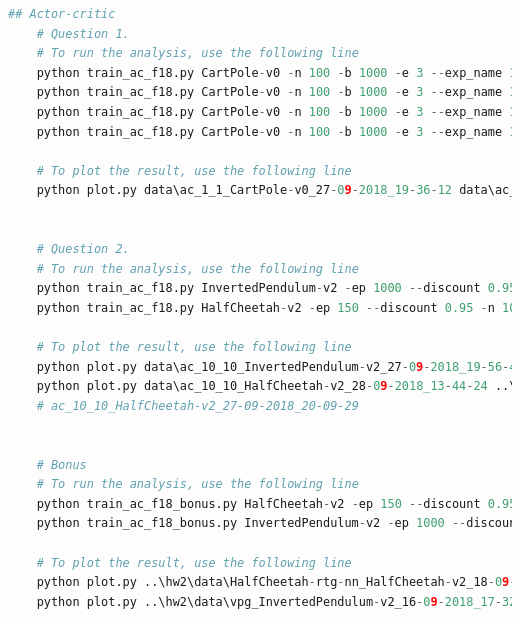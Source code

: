 \documentclass[12pt]{article}
\begin{document}
  \pagebreak

  \begin{lstlisting}[language=Python]
	## Actor-critic
	# Question 1.
	# To run the analysis, use the following line
	python train_ac_f18.py CartPole-v0 -n 100 -b 1000 -e 3 --exp_name 1_1 -ntu 1 -ngsptu 1
	python train_ac_f18.py CartPole-v0 -n 100 -b 1000 -e 3 --exp_name 100_1 -ntu 100 -ngsptu 1
	python train_ac_f18.py CartPole-v0 -n 100 -b 1000 -e 3 --exp_name 1_100 -ntu 1 -ngsptu 100
	python train_ac_f18.py CartPole-v0 -n 100 -b 1000 -e 3 --exp_name 10_10 -ntu 10 -ngsptu 10
	
	# To plot the result, use the following line
	python plot.py data\ac_1_1_CartPole-v0_27-09-2018_19-36-12 data\ac_1_100_CartPole-v0_27-09-2018_19-42-41 data\ac_10_10_CartPole-v0_27-09-2018_19-45-46 data\ac_100_1_CartPole-v0_27-09-2018_19-39-10
	
	
	# Question 2.
	# To run the analysis, use the following line
	python train_ac_f18.py InvertedPendulum-v2 -ep 1000 --discount 0.95 -n 100 -e 3 -l 2 -s 64 -b 5000 -lr 0.01 --exp_name 10_10 -ntu 10 -ngsptu 10
	python train_ac_f18.py HalfCheetah-v2 -ep 150 --discount 0.95 -n 100 -e 3 -l 2 -s 32 -b 30000 -lr 0.02 --exp_name 10_10 -ntu 10 -ngsptu 10
	
	# To plot the result, use the following line
	python plot.py data\ac_10_10_InvertedPendulum-v2_27-09-2018_19-56-45 ..\hw2\data\vpg_InvertedPendulum-v2_16-09-2018_17-32-43
	python plot.py data\ac_10_10_HalfCheetah-v2_28-09-2018_13-44-24 ..\hw2\data\HalfCheetah-rtg-nn_HalfCheetah-v2_18-09-2018_10-43-21 ..\hw2\data\HalfCheetah_HalfCheetah-v2_17-09-2018_23-52-16
	# ac_10_10_HalfCheetah-v2_27-09-2018_20-09-29
	
	
	# Bonus
	# To run the analysis, use the following line
	python train_ac_f18_bonus.py HalfCheetah-v2 -ep 150 --discount 0.95 -n 100 -e 3 -l 2 -s 32 -b 30000 -lr 0.02 --exp_name 10_10_v_7_48_0005 -ntu 10 -ngsptu 10 -vl 7 -vs 48 -vlr 0.005
	python train_ac_f18_bonus.py InvertedPendulum-v2 -ep 1000 --discount 0.95 -n 100 -e 3 -l 2 -s 64 -b 5000 -lr 0.01 --exp_name 10_10_v_7_48_0005 -ntu 10 -ngsptu 10 -vl 7 -vs 48 -vlr 0.005
	
	# To plot the result, use the following line
	python plot.py ..\hw2\data\HalfCheetah-rtg-nn_HalfCheetah-v2_18-09-2018_10-43-21 data\ac_10_10_HalfCheetah-v2_28-09-2018_13-44-24 data\ac_10_10_v_7_48_0005_HalfCheetah-v2_28-09-2018_22-07-19
	python plot.py ..\hw2\data\vpg_InvertedPendulum-v2_16-09-2018_17-32-43 data\ac_10_10_InvertedPendulum-v2_27-09-2018_19-56-45 data\ac_10_10_v_7_48_0005_InvertedPendulum-v2_29-09-2018_00-15-23
  \end{lstlisting}
	
\end{document}
